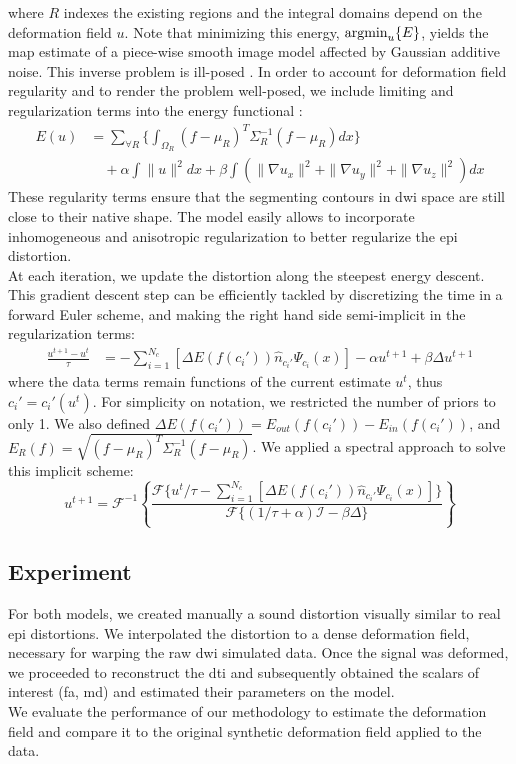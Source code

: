where $R$ indexes the existing regions and the integral domains
depend on the deformation field $u$. Note
that minimizing this energy, $\operatorname{argmin}_u\{E\}$, yields the \ac{map} 
estimate of a piece-wise smooth image model affected by Gaussian 
additive noise. This inverse problem is ill-posed
\cite{bertero_ill-posed_1988,hadamard_sur_1902}.
In order to account for deformation field regularity and to render the 
problem well-posed, we include limiting and regularization terms into 
the energy functional \cite{morozov_linear_1975,tichonov_solution_1963}:
%
\begin{align}
\label{eq:complete_energy}
E(u) &= \sum_{\forall{R}} \lbrace \int_{\Omega_R} (f-\mu_R)^T\Sigma_R^{-1}(f-\mu_R) dx \rbrace \nonumber \\
&\quad + \alpha \int  \|u\|^2 dx + \beta \int \left( \|\nabla u_x\|^2 + \|\nabla u_y\|^2 + \|\nabla u_z\|^2\right) dx
\end{align}
%
These regularity terms ensure that the segmenting contours in 
\ac{dwi} space are still close to their native shape. The model
easily allows to incorporate inhomogeneous and anisotropic 
regularization \cite{nagel_investigation_1986} to better regularize
the \ac{epi} distortion. \\
%

At each iteration, we update the distortion along the steepest 
energy descent. This gradient descent step can be efficiently 
tackled by discretizing the time in a forward Euler scheme, 
and making the right hand side semi-implicit in the 
regularization terms:
%
\begin{align}
\frac{u^{t+1}-u^t}{\tau} &= - \sum_{i=1}^{N_c} \left[ \Delta E(f(c_i'))  \hat{n}_{c_i'} \Psi_{c_i}(x) \right] -\alpha u^{t+1} + \beta\Delta u^{t+1}
\end{align}
%
where the data terms remain functions of the current estimate 
$u^t$, thus $c_i' = c_i'(u^t)$. For simplicity on notation, we 
restricted the number of priors to only 1. We also defined 
$\Delta E(f(c_i')) = E_{out}(f(c_i')) - E_{in}(f(c_i'))$, 
and $E_R(f) = \sqrt{(f-\mu_R)^T\Sigma_R^{-1}(f-\mu_R)}$.
We applied a spectral approach to solve this implicit scheme:
%
\begin{equation}
u^{t+1} = \mathcal{F}^{-1}\left\{ \frac{\mathcal{F}\{u^t/\tau
- \sum_{i=1}^{N_c} \left[ \Delta E(f(c_i')) \hat{n}_{c_i'} \Psi_{c_i}(x) \right]  \}}{\mathcal{F}\{(1/\tau+\alpha)\mathcal{I}-\beta\Delta\}} \right\}
\end{equation}
%

\subsection{Experiment}
%
For both models, we created manually a sound distortion visually similar
to real \ac{epi} distortions. We interpolated the distortion to a 
dense deformation field, necessary for warping the raw \ac{dwi} simulated
data. Once the signal was deformed, we proceeded to reconstruct the
\ac{dti} and subsequently obtained the scalars of interest (\ac{fa}, \ac{md}) and estimated their parameters on the model.\\

We evaluate the performance of our methodology to estimate the deformation
field and compare it to the original synthetic deformation field applied to the data.
